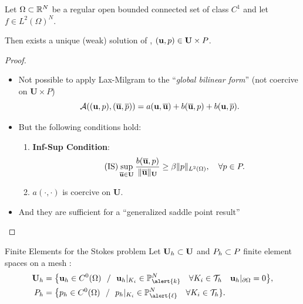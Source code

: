 \SetEmptyBackground
\begin{frame}
    \begin{theorem}
      Let $\Omega\subset\Rset^N$ be a regular open bounded connected set of
      class $C^1$ and let $f\in L^2(\Omega)^N$.
      \par\smallskip Then \alert{exists a unique
      (weak) solution of \steadyStokes}, $(\uu,p)\in \mathbf{U}\times P$.
    \end{theorem}
    \begin{proof}
      \small
      \begin{itemize}
        \setlength{\itemsep}{0.5em}
      \item \small{Not possible to apply Lax-Milgram to the ``\textit{global bilinear
        form}'' (not coercive on $\textbf{U}\times P$)}
        \vspace{-0.5em}
        $$
        {\cal A}((\uu,\pp),(\bu,\bp))=a(\uu,\bu)+b(\bu,\pp)+b(\uu,\bp).
        $$
        \vspace{-1.5em}
      \item But the following conditions hold:
        \begin{enumerate}
        \item  \alert{\textbf{Inf-Sup
              Condition}}:
          \begin{equation}
            \tag{IS}
            \sup_{\bu\in\mathbf{U}}\frac{b(\bu,p)}{\norm[\mathbf{U}]{\bu}} \ge \beta \norm[L^2(\Omega)]{p}, \quad \forall p\in P.
          \end{equation}
          \vspace{-0.5em}
        \item $a(\cdot,\cdot)$ is coercive on \textbf{U}.
        \end{enumerate}
      \item And they are sufficient for a ``generalized saddle point result''  \cite{Boffi-Brezzi-Fortin:08}
      \end{itemize}
    \end{proof}
\end{frame}

\SetDefaultBackground
\begin{frame}{Finite Elements for the Stokes problem}
  Let $\Uh\subset \mathbf{U}$ and $\Ph\subset P$ finite element spaces on a mesh \Th:
  \begin{align*}
    \Uh &= \big\{\uh \in C^0(\Omega) \ \st\ \uh|_{K_i}\in \mathbb{P}_{\alert{k}}^N \quad \forall K_i\in \Th \quad \uh|_{\partial\Omega}=0\big\},
    \\
    \Ph &= \big\{\ph \in C^0(\Omega) \ \st\ \ph|_{K_i}\in \mathbb{P}_{\alert{\ell}}^N \quad \forall K_i\in \Th\}.
  \end{align*}


\end{frame}

